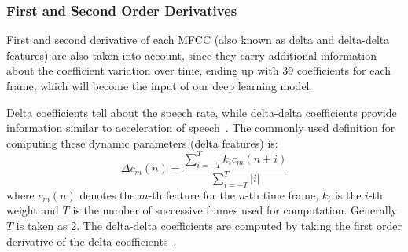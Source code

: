 \subsubsection{First and Second Order Derivatives}
First and second derivative of each MFCC (also known as delta and delta-delta features) are also taken into account, since they carry additional information about the coefficient variation over time, ending up with 39 coefficients for each frame, which will become the input of our deep learning model.

Delta coefficients tell about the speech rate, while delta-delta coefficients provide information similar to acceleration of speech~\cite{rao:spectral}. The commonly used definition for computing these dynamic parameters (delta features) is:
\begin{equation}
	\Delta c_m(n) = \frac{\sum_{i = -T}^{T} k_i c_m (n + i)}{\sum_{i = -T}^{T}\lvert i \rvert}
\end{equation}
where $c_m(n)$ denotes the $m$-th feature for the $n$-th time frame, $k_i$ is the $i$-th weight and $T$ is the number of successive frames used for computation. Generally $T$ is taken as $2$. The delta-delta coefficients are computed by taking the first order derivative of the delta coefficients~\cite{rao:spectral}.